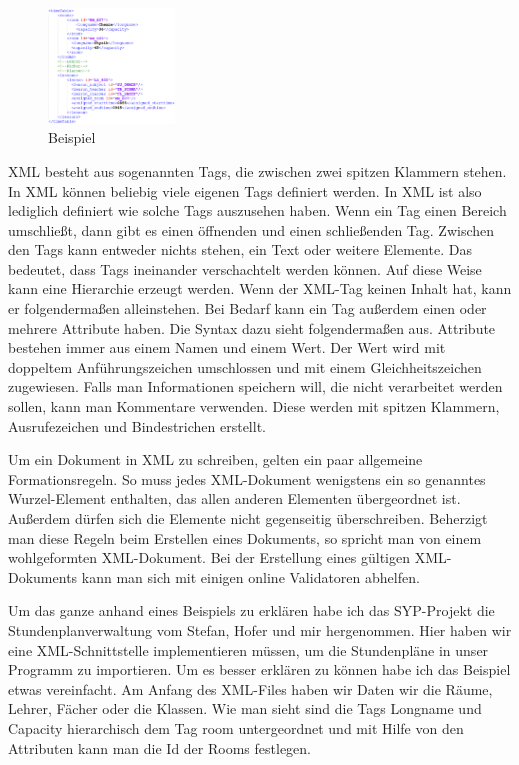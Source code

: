 \begin{figure}
    \begin{center}
        \includegraphics[width=0.3\textwidth]{Content/images/xml/xml.png}
    \end{center}
    \caption{Beispiel}
  \end{figure}
XML besteht aus sogenannten Tags, die zwischen zwei spitzen Klammern stehen. In XML können beliebig viele eigenen Tags definiert werden. In XML ist also lediglich definiert wie solche Tags auszusehen haben. Wenn ein Tag einen Bereich umschließt, dann gibt es einen öffnenden und einen schließenden Tag. Zwischen den Tags kann entweder nichts stehen, ein Text oder weitere Elemente. Das bedeutet, dass Tags ineinander verschachtelt werden können. Auf diese Weise kann eine Hierarchie erzeugt werden. Wenn der XML-Tag keinen Inhalt hat, kann er folgendermaßen alleinstehen. Bei Bedarf kann ein Tag außerdem einen oder mehrere Attribute haben. Die Syntax dazu sieht folgendermaßen aus. Attribute bestehen immer aus einem Namen und einem Wert. Der Wert wird mit doppeltem Anführungszeichen umschlossen und mit einem Gleichheitszeichen zugewiesen. 
Falls man Informationen speichern will, die nicht verarbeitet werden sollen, kann man Kommentare verwenden. Diese werden mit spitzen Klammern, Ausrufezeichen und Bindestrichen erstellt.

Um ein Dokument in XML zu schreiben, gelten ein paar allgemeine Formationsregeln. So muss jedes XML-Dokument wenigstens ein so genanntes Wurzel-Element enthalten, das allen anderen Elementen übergeordnet ist. Außerdem dürfen sich die Elemente nicht gegenseitig überschreiben. Beherzigt man diese Regeln beim Erstellen eines Dokuments, so spricht man von einem wohlgeformten XML-Dokument.
Bei der Erstellung eines gültigen XML-Dokuments kann man sich mit einigen online Validatoren abhelfen.

Um das ganze anhand eines Beispiels zu erklären habe ich das SYP-Projekt die Stundenplanverwaltung vom Stefan, Hofer und mir hergenommen. Hier haben wir eine XML-Schnittstelle implementieren müssen, um die Stundenpläne in unser Programm zu importieren. Um es besser erklären zu können habe ich das Beispiel etwas vereinfacht. Am Anfang des XML-Files haben wir Daten wir die Räume, Lehrer, Fächer oder die Klassen.
Wie man sieht sind die Tags Longname und Capacity hierarchisch dem Tag room untergeordnet und mit Hilfe von den Attributen kann man die Id der Rooms festlegen.

